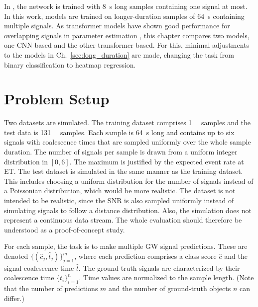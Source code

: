 In \cite{PhysRevD.100.063015}, the network is trained with \SI{8}{\second} long samples containing one signal at most. In this work, models are trained on longer-duration samples of \SI{64}{\second} containing multiple signals. 
As transformer models have shown good performance for overlapping signals in parameter estimation \cite{Papalini_2025}, this chapter compares two models, one CNN based and the other transformer based. For this, minimal adjustments to the models in Ch.~\ref{sec:long_duration} are made, changing the task from binary classification to heatmap regression.



\section{Problem Setup}
\label{sec:heatmap:setup}


Two datasets are simulated. The training dataset comprises \SI{1}{\mega\nothing} samples and the test data is \SI{131}{\kilo\nothing} samples. Each sample is \SI{64}{\second} long and contains up to six signals with coalescence times that are sampled uniformly over the whole sample duration. The number of signals per sample is drawn from a uniform integer distribution in $[0,6]$. The maximum is justified by the expected event rate at ET. The test dataset is simulated in the same manner as the training dataset. This includes choosing a uniform distribution for the number of signals instead of a Poissonian distribution, which would be more realistic. The dataset is not intended to be realistic, since the SNR is also sampled uniformly instead of simulating signals to follow a distance distribution. Also, the simulation does not represent a continuous data stream. The whole evaluation should therefore be understood as a proof-of-concept study.


For each sample, the task is to make multiple GW signal predictions. These are denoted $\{(\hat{c}_j,\hat{t}_j)\}_{j=1}^{m}$, where each prediction comprises a class score $\hat{c}$ and the signal coalescence time $\hat{t}$. The ground-truth signals are characterized by their coalescence time $\{t_i\}_{i=1}^{n}$. Time values are normalized to the sample length. (Note that the number of predictions $m$ and the number of ground-truth objects $n$ can differ.) 

